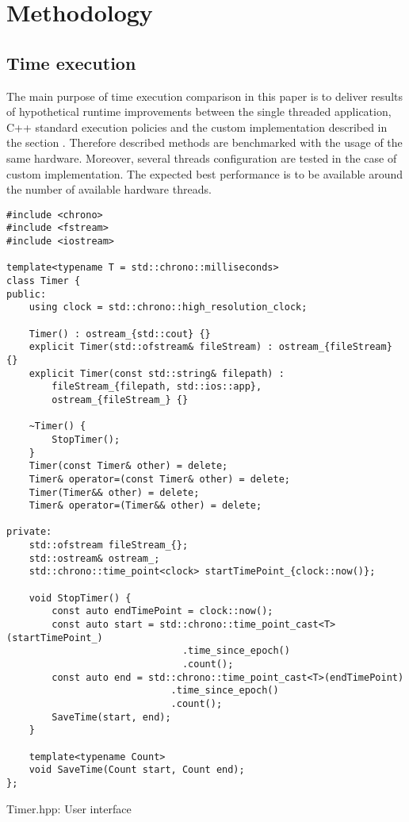 \section{Methodology}

\subsection{Time execution}

The main purpose of time execution comparison in this paper is to deliver results of hypothetical runtime
improvements between the single threaded application, C++ standard execution policies and the custom
implementation described in the section . Therefore described methods are
benchmarked with the usage of the same hardware. Moreover, several threads configuration are tested
in the case of custom implementation. The expected best performance is to be available around
the number of available hardware threads.

\begin{listing}[htb]
\begin{verbatim}
#include <chrono>
#include <fstream>
#include <iostream>

template<typename T = std::chrono::milliseconds>
class Timer {
public:
    using clock = std::chrono::high_resolution_clock;

    Timer() : ostream_{std::cout} {}
    explicit Timer(std::ofstream& fileStream) : ostream_{fileStream} {}
    explicit Timer(const std::string& filepath) :
        fileStream_{filepath, std::ios::app},
        ostream_{fileStream_} {}

    ~Timer() {
        StopTimer();
    }
    Timer(const Timer& other) = delete;
    Timer& operator=(const Timer& other) = delete;
    Timer(Timer&& other) = delete;
    Timer& operator=(Timer&& other) = delete;

private:
    std::ofstream fileStream_{};
    std::ostream& ostream_;
    std::chrono::time_point<clock> startTimePoint_{clock::now()};

    void StopTimer() {
        const auto endTimePoint = clock::now();
        const auto start = std::chrono::time_point_cast<T>(startTimePoint_)
                               .time_since_epoch()
                               .count();
        const auto end = std::chrono::time_point_cast<T>(endTimePoint)
                             .time_since_epoch()
                             .count();
        SaveTime(start, end);
    }

    template<typename Count>
    void SaveTime(Count start, Count end);
};
\end{verbatim}
\caption{Timer.hpp: User interface}
\label{lst:timer_interface}
\end{listing}

